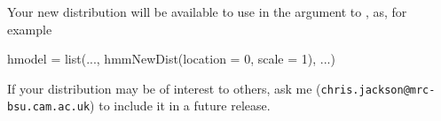 Your new distribution will be available to use in the 
argument to , as, for example
\begin{Scode}
hmodel = list(..., hmmNewDist(location = 0, scale = 1), ...)
\end{Scode}
If your distribution may be of interest to others, ask me
(\texttt{chris.jackson@mrc-bsu.cam.ac.uk}) to include it in a future
release.


\clearpage


